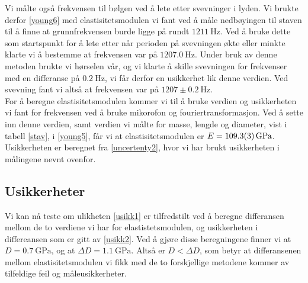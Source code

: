 \documentclass[%
 reprint,
 amsmath,amssymb,
 aps,
 norsk,
 booktabs
]{revtex4-1}
\begin{document}
Vi målte også frekvensen til bølgen ved å lete etter svevninger i lyden. Vi brukte derfor \eqref{young6} med elastisitetsmodulen vi fant ved å måle nedbøyingen til staven til å finne at grunnfrekvensen burde ligge på rundt $\SI{1211}{\hertz}$. Ved å bruke dette som startspunkt for å lete etter når perioden på svevningen økte eller minkte klarte vi å bestemme at frekvensen var på $\SI{1207.0}{\hertz}$. Under bruk av denne metoden brukte vi hørselen vår, og vi klarte å skille svevningen for frekvenser med en differanse på $\SI{0.2}{\hertz}$, vi får derfor en usikkerhet lik denne verdien. Ved svevning fant vi altså at frekvensen var på $1207\pm\SI{0.2}{\hertz}$.\\
For å beregne elastisitetsmodulen kommer vi til å bruke verdien og usikkerheten vi fant for frekvensen ved å bruke mikorofon og fouriertransformasjon. Ved å sette inn denne verdien, samt verdien vi målte for masse, lengde og diameter, vist i tabell \vref{stav}, i \eqref{young5}, får vi at elastisitetsmodulen er $E = \SI{109.3\pm0.3}{\giga\pascal}$. Usikkerheten er beregnet fra \eqref{uncertenty2}, hvor vi har brukt usikkerheten i målingene nevnt ovenfor.
\subsection{Usikkerheter}
Vi kan nå teste om ulikheten \eqref{usikk1} er tilfredstilt ved å beregne differansen mellom de to verdiene vi har for elastistetsmodulen, og usikkerheten i differeansen som er gitt av \eqref{usikk2}. Ved å gjøre disse beregningene finner vi at $D = \SI{0.7}{\giga\pascal}$, og at $\Delta D = \SI{1.1}{\giga\pascal}$. Altså er $D<\Delta D$, som betyr at differansenen mellom elastisitetsmodulen vi fikk med de to forskjellige metodene kommer av tilfeldige feil og måleusikkerheter.
\end{document}
